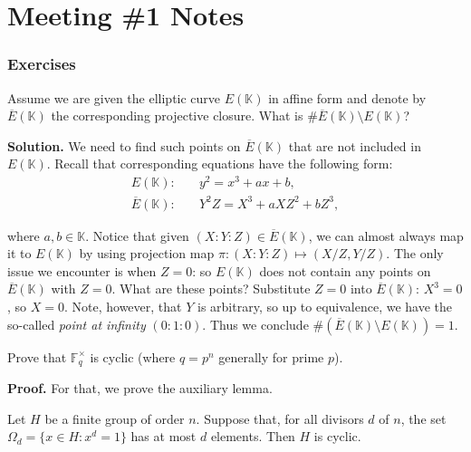 \documentclass{template}
\begin{document}
\section{Meeting \#1 Notes}

\subsubsection*{Exercises}

\begin{problem}
    Assume we are given the elliptic curve $E(\mathbb{K})$ in affine form and
    denote by $\overline{E}(\mathbb{K})$ the corresponding projective closure.
    What is $\#\overline{E}(\mathbb{K})\setminus E(\mathbb{K})$?
\end{problem}

\textbf{Solution.} We need to find such points on $\overline{E}(\mathbb{K})$
that are not included in $E(\mathbb{K})$. Recall that corresponding 
equations have the following form:
\begin{align*}
    E(\mathbb{K}): & \quad y^2 = x^3 + ax + b, \\
    \overline{E}(\mathbb{K}): & \quad Y^2Z = X^3 + aXZ^2 + bZ^3,
\end{align*}

where $a,b \in \mathbb{K}$. Notice that given $(X:Y:Z) \in
\overline{E}(\mathbb{K})$, we can almost always map it to $E(\mathbb{K})$ by
using projection map $\pi: (X:Y:Z) \mapsto (X/Z,Y/Z)$. The only issue we
encounter is when $Z=0$: so $E(\mathbb{K})$ does not contain any points on
$\overline{E}(\mathbb{K})$ with $Z=0$. What are these points? Substitute $Z=0$
into $\overline{E}(\mathbb{K})$: $X^3=0$, so $X=0$. Note, however, that $Y$ is
arbitrary, so up to equivalence, we have the so-called \textit{point at
infinity} $(0:1:0)$. Thus we conclude $\#\left(\overline{E}(\mathbb{K})\setminus
E(\mathbb{K})\right)=1$.

\begin{problem}
    Prove that $\mathbb{F}_q^{\times}$ is cyclic (where $q=p^n$ generally for
    prime $p$).
\end{problem}

\textbf{Proof.} For that, we prove the auxiliary lemma.

\begin{lemma}
    Let $H$ be a finite group of order $n$. Suppose that, for all divisors $d$
    of $n$, the set $\Omega_d=\{x \in H: x^d=1\}$ has at most $d$ elements. Then
    $H$ is cyclic.
\end{lemma}
\end{document}
